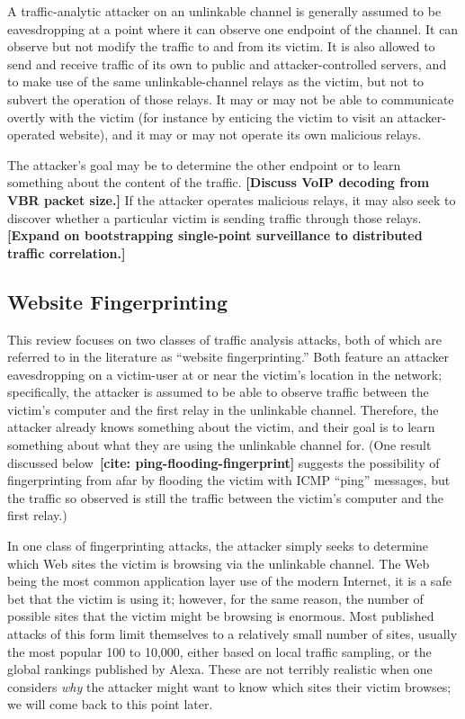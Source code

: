 \documentclass{zarticle}
\def\todo#1{{\color{todocolor}\bfseries [#1]}}
\def\needcite#1{\todo{cite: #1}}
\begin{document}
A traffic-analytic attacker on an unlinkable channel is generally
assumed to be eavesdropping at a point where it can observe one
endpoint of the channel.  It can observe but not modify the traffic to
and from its victim.  It is also allowed to send and receive traffic
of its own to public and attacker-controlled servers, and to make use
of the same unlinkable-channel relays as the victim, but not to
subvert the operation of those relays.  It may or may not be able to
communicate overtly with the victim (for instance by enticing the
victim to visit an attacker-operated website), and it may or may not
operate its own malicious relays.

The attacker's goal may be to determine the other endpoint or to learn
something about the content of the traffic.  \todo{Discuss VoIP
  decoding from VBR packet size.}  If the attacker operates malicious
relays, it may also seek to discover whether a particular victim is
sending traffic through those relays. \todo{Expand on bootstrapping
  single-point surveillance to distributed traffic correlation.}

\subsection{Website Fingerprinting}

This review focuses on two classes of traffic analysis attacks, both
of which are referred to in the literature as “website
fingerprinting.”  Both feature an attacker eavesdropping on a
victim-user at or near the victim's location in the network;
specifically, the attacker is assumed to be able to observe traffic
between the victim's computer and the first relay in the unlinkable
channel.  Therefore, the attacker already knows something about the
victim, and their goal is to learn something about what they are using
the unlinkable channel for.  (One result discussed
below~\needcite{ping-flooding-fingerprint} suggests the possibility of
fingerprinting from afar by flooding the victim with ICMP “ping”
messages, but the traffic so observed is still the traffic between the
victim's computer and the first relay.)

In one class of fingerprinting attacks, the attacker simply seeks to
determine which Web sites the victim is browsing via the unlinkable
channel.  The Web being the most common application layer use of the
modern Internet, it is a safe bet that the victim is using it;
however, for the same reason, the number of possible sites that the
victim might be browsing is enormous.  Most published attacks of this
form limit themselves to a relatively small number of sites, usually
the most popular 100 to 10,000, either based on local traffic
sampling, or the global rankings published by Alexa.  These are not
terribly realistic when one considers \emph{why} the attacker might
want to know which sites their victim browses; we will come back to
this point later.
\end{document}
